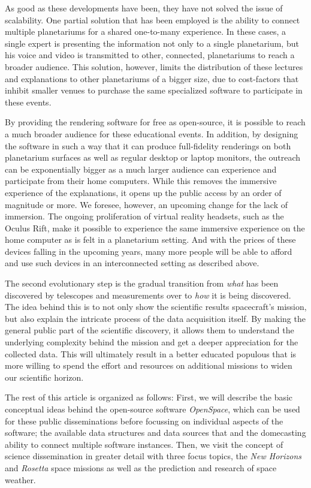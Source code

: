 \documentclass{vgtc}                %
\begin{document}
As good as these developments have been, they have not solved the issue of scalability. One partial solution that has been employed is the ability to connect multiple planetariums for a shared one-to-many experience. In these cases, a single expert is presenting the information not only to a single planetarium, but his voice and video is transmitted to other, connected, planetariums to reach a broader audience. This solution, however, limits the distribution of these lectures and explanations to other planetariums of a bigger size, due to cost-factors that inhibit smaller venues to purchase the same specialized software to participate in these events.

By providing the rendering software for free as open-source, it is possible to reach a much broader audience for these educational events. In addition, by designing the software in such a way that it can produce full-fidelity renderings on both planetarium surfaces as well as regular desktop or laptop monitors, the outreach can be exponentially bigger as a much larger audience can experience and participate from their home computers. While this removes the immersive experience of the explanations, it opens up the public access by an order of magnitude or more. We foresee, however, an upcoming change for the lack of immersion. The ongoing proliferation of virtual reality headsets, such as the Oculus Rift, make it possible to experience the same immersive experience on the home computer as is felt in a planetarium setting. And with the prices of these devices falling in the upcoming years, many more people will be able to afford and use such devices in an interconnected setting as described above.

The second evolutionary step is the gradual transition from \emph{what} has been discovered by telescopes and measurements over to \emph{how} it is being discovered. The idea behind this is to not only show the scientific results spacecraft's mission, but also explain the intricate process of the data acquisition itself. By making the general public part of the scientific discovery, it allows them to understand the underlying complexity behind the mission and get a deeper appreciation for the collected data. This will ultimately result in a better educated populous that is more willing to spend the effort and resources on additional missions to widen our scientific horizon.

The rest of this article is organized as follows: First, we will describe the basic conceptual ideas behind the open-source software \emph{OpenSpace}, which can be used for these public disseminations before focussing on individual aspects of the software; the available data structures and data sources that and the domecasting ability to connect multiple software instances. Then, we visit the concept of science dissemination in greater detail with three focus topics, the \emph{New Horizons} and \emph{Rosetta} space missions as well as the prediction and research of space weather.
\end{document}
